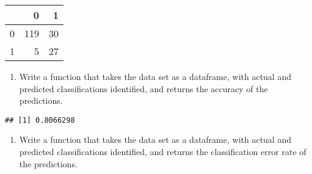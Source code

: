 \documentclass[]{article}
\newenvironment{Shaded}{\begin{snugshade}}{\end{snugshade}}
\newcommand{\KeywordTok}[1]{\textcolor[rgb]{0.13,0.29,0.53}{\textbf{#1}}}
\newcommand{\DecValTok}[1]{\textcolor[rgb]{0.00,0.00,0.81}{#1}}
\newcommand{\StringTok}[1]{\textcolor[rgb]{0.31,0.60,0.02}{#1}}
\newcommand{\ControlFlowTok}[1]{\textcolor[rgb]{0.13,0.29,0.53}{\textbf{#1}}}
\newcommand{\OperatorTok}[1]{\textcolor[rgb]{0.81,0.36,0.00}{\textbf{#1}}}
\newcommand{\NormalTok}[1]{#1}
\providecommand{\tightlist}{%
  \setlength{\itemsep}{0pt}\setlength{\parskip}{0pt}}
\begin{document}
\begin{Shaded}
\end{Shaded}

\begin{longtable}[]{@{}lrr@{}}
\toprule
& 0 & 1\tabularnewline
\midrule
\endhead
0 & 119 & 30\tabularnewline
1 & 5 & 27\tabularnewline
\bottomrule
\end{longtable}

\begin{enumerate}
\def\labelenumi{\arabic{enumi}.}
\setcounter{enumi}{2}
\tightlist
\item
  Write a function that takes the data set as a dataframe, with actual
  and predicted classifications identified, and returns the accuracy of
  the predictions.
\end{enumerate}

\begin{Shaded}
\end{Shaded}

\begin{verbatim}
## [1] 0.8066298
\end{verbatim}

\begin{enumerate}
\def\labelenumi{\arabic{enumi}.}
\setcounter{enumi}{3}
\tightlist
\item
  Write a function that takes the data set as a dataframe, with actual
  and predicted classifications identified, and returns the
  classification error rate of the predictions.
\end{enumerate}
\end{document}
